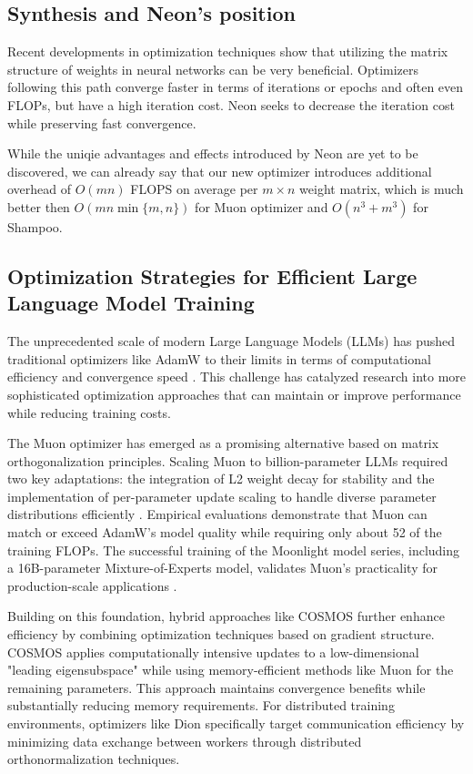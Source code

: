 \documentclass{article} %
\begin{document}
\subsection{Synthesis and Neon's position}

Recent developments in optimization techniques show that utilizing the matrix structure of weights in neural networks can be very beneficial. Optimizers following this path converge faster in terms of iterations or epochs and often even FLOPs, but have a high iteration cost. Neon seeks to decrease the iteration cost while preserving fast convergence.

While the uniqie advantages and effects introduced by Neon are yet to be discovered, we can already say that our new optimizer introduces additional overhead of $O(mn)$ FLOPS on average per $m \times n$ weight matrix, which is much better then $O(m n \min\{m, n\})$ for Muon optimizer and $O(n^3 + m^3)$ for Shampoo. 

\subsection{Optimization Strategies for Efficient Large Language Model Training}
The unprecedented scale of modern Large Language Models (LLMs) has pushed traditional optimizers like AdamW \cite{Loshchilov2017FixingWD} to their limits in terms of computational efficiency and convergence speed \cite{liu2025muon,chen2025cosmoshybridadaptive}. This challenge has catalyzed research into more sophisticated optimization approaches that can maintain or improve performance while reducing training costs.

The Muon optimizer  has emerged as a promising alternative based on matrix orthogonalization principles. Scaling Muon to billion-parameter LLMs required two key adaptations: the integration of L2 weight decay for stability and the implementation of per-parameter update scaling to handle diverse parameter distributions efficiently . Empirical evaluations demonstrate that Muon can match or exceed AdamW's model quality while requiring only about 52 of the training FLOPs. The successful training of the Moonlight model series, including a 16B-parameter Mixture-of-Experts model, validates Muon's practicality for production-scale applications \cite{liu2025muon}.

Building on this foundation, hybrid approaches like COSMOS \cite{chen2025cosmoshybridadaptive} further enhance efficiency by combining optimization techniques based on gradient structure. COSMOS applies computationally intensive updates to a low-dimensional "leading eigensubspace" while using memory-efficient methods like Muon for the remaining parameters. This approach maintains convergence benefits while substantially reducing memory requirements. For distributed training environments, optimizers like Dion \cite{ahn2025dioncommunicationefficientoptimizerlarge} specifically target communication efficiency by minimizing data exchange between workers through distributed orthonormalization techniques.
\end{document}
